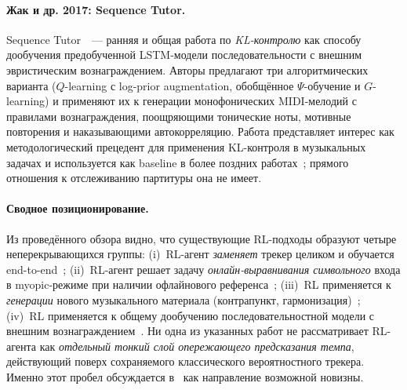 \paragraph*{Жак и др. 2017: Sequence Tutor.} Sequence
Tutor~\cite{Jaques2017SeqTutor}~--- ранняя и общая работа по
\textit{KL-контролю} как способу дообучения предобученной
LSTM-модели последовательности с внешним эвристическим
вознаграждением. Авторы предлагают три алгоритмических варианта
($Q$-learning с log-prior augmentation, обобщённое $\Psi$-обучение
и $G$-learning) и применяют их к генерации монофонических MIDI-мелодий
с правилами вознаграждения, поощряющими тонические ноты, мотивные
повторения и наказывающими автокорреляцию. Работа представляет
интерес как методологический прецедент для применения KL-контроля
в музыкальных задачах и используется как baseline в более поздних
работах~\cite{Jiang2020RLDuet,Wu2024ReaLchords}; прямого отношения
к отслеживанию партитуры она не имеет.

\paragraph*{Сводное позиционирование.} Из проведённого обзора
видно, что существующие RL-подходы образуют четыре неперекрывающихся
группы: (i)~RL-агент \textit{заменяет} трекер целиком и обучается
end-to-end~\cite{Dorfer2018RL}; (ii)~RL-агент решает задачу
\textit{онлайн-выравнивания символьного} входа в myopic-режиме при
наличии офлайнового референса~\cite{Peter2023}; (iii)~RL применяется
к \textit{генерации} нового музыкального материала
(контрапункт, гармонизация)~\cite{Jiang2020RLDuet,Wu2024ReaLchords};
(iv)~RL применяется к общему дообучению последовательностной модели
с внешним вознаграждением~\cite{Jaques2017SeqTutor}. Ни одна из
указанных работ не рассматривает RL-агента как \textit{отдельный
тонкий слой опережающего предсказания темпа}, действующий поверх
сохраняемого классического вероятностного трекера. Именно этот пробел
обсуждается в~ как направление возможной новизны.
